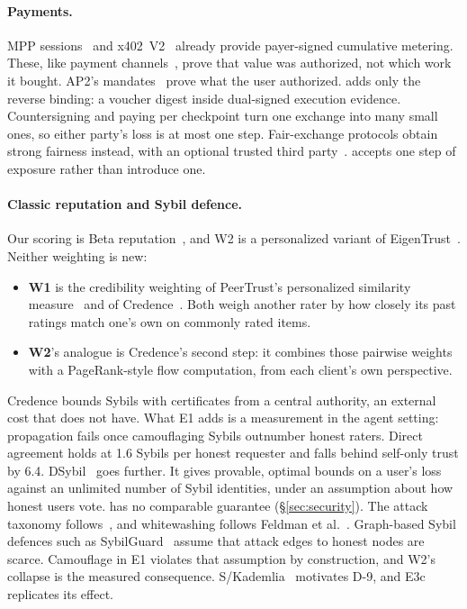 \paragraph{Payments.}
MPP sessions~\cite{mpp2026} and x402~V2~\cite{x402v2} already provide
payer-signed cumulative metering. These, like payment
channels~\cite{poon2016lightning}, prove that value was authorized, not
which work it bought. AP2's mandates~\cite{ap2} prove what the user
authorized. \sys{} adds only the reverse binding: a voucher digest inside
dual-signed execution evidence. Countersigning and paying per checkpoint
turn one exchange into many small ones, so either party's loss is at
most one step. Fair-exchange protocols obtain strong fairness instead,
with an optional trusted third party~\cite{asokan1997fairexchange}. \sys{}
accepts one step of exposure rather than introduce one.

\paragraph{Classic reputation and Sybil defence.}
Our scoring is Beta reputation~\cite{josang2002beta}, and W2 is a
personalized variant of EigenTrust~\cite{kamvar2003eigentrust}. Neither
weighting is new:
\begin{itemize}
\item \textbf{W1} is the credibility weighting of PeerTrust's personalized
  similarity measure~\cite{xiong2004peertrust} and of
  Credence~\cite{walsh2006credence}. Both weigh another rater by how
  closely its past ratings match one's own on commonly rated items.
\item \textbf{W2}'s analogue is Credence's second step: it combines those
  pairwise weights with a PageRank-style flow computation, from each
  client's own perspective.
\end{itemize}
Credence bounds Sybils with certificates from a central authority, an
external cost that \sys{} does not have. What E1 adds is a measurement in
the agent setting: propagation fails once camouflaging Sybils outnumber
honest raters. Direct agreement holds at 1.6 Sybils per honest requester and falls behind self-only trust by 6.4.
DSybil~\cite{yu2009dsybil} goes further. It gives provable, optimal
bounds on a user's loss against an unlimited number of Sybil identities,
under an assumption about how honest users vote. \sys{} has no comparable
guarantee (\S\ref{sec:security}). The
attack taxonomy follows~\cite{hoffman2009survey}, and whitewashing
follows Feldman et al.~\cite{feldman2006whitewashing}. Graph-based Sybil
defences such as SybilGuard~\cite{yu2006sybilguard} assume that
attack edges to honest nodes are scarce. Camouflage in E1 violates that
assumption by construction, and W2's collapse is the measured
consequence. S/Kademlia~\cite{baumgart2007skademlia} motivates D-9, and
E3c replicates its effect.
